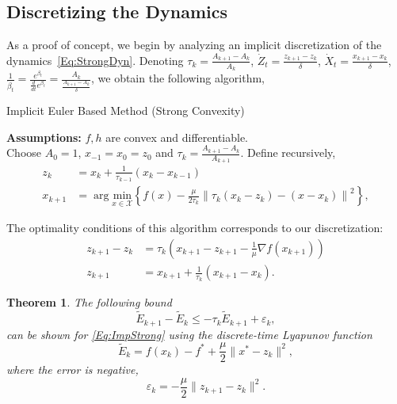 \documentclass[11pt]{article}
\theoremstyle{plain}
\newtheorem{theorem}{Theorem}
\newcommand{\X}{{\mathcal X}}
\begin{document}
\subsection{Discretizing the Dynamics}
As a proof of concept, we begin by analyzing an implicit discretization of the dynamics~\eqref{Eq:StrongDyn}. 
Denoting  $\tau_k = \frac{A_{k+1} - A_k}{A_k}$, $\dot Z_t = \frac{z_{k+1} - z_k}{\delta}$, $\dot X_t = \frac{x_{k+1} - x_k}{\delta}$, $\frac{1}{\dot \beta_t} = \frac{e^{\beta_t}}{\frac{d}{dt} e^{\beta_t}} = \frac{A_{k}}{\frac{A_{k+1} - A_k}{\delta}}$, 
we obtain the following algorithm, 
\begin{algorithm}[H]
\caption{Implicit Euler Based Method (Strong Convexity)}
{\bf Assumptions:} $f, h$ are convex and differentiable.\\
Choose $A_0 = 1$, $x_{-1}=x_0 = z_0$ and $\tau_{k} = \frac{A_{k+1} - A_k}{A_{k+1}}$. Define recursively,
\begin{subequations}
\begin{align}\label{Eq:AlgoForward}
z_{k} &= x_{k} + \frac{1}{\tau_{k-1}}(x_{k} - x_{k-1})\\
x_{k+1} &= \arg\underset{x\in\X}{\text{min}} \left\{ f(x) - \frac{\mu}{2\tau_k}\left\|\tau_k(x_k - z_k) - (x - x_k)\right\|^2\right\},
\end{align}
\end{subequations}
\end{algorithm}
\noindent The optimality conditions of this algorithm corresponds to our discretization: 
\begin{subequations}\label{Eq:ImpStrong}
\begin{align}
z_{k+1} - z_k &= \tau_k \left( x_{k+1} - z_{k+1} - \frac{1}{\mu} \nabla f(x_{k+1})\right) \label{Eq:ZImpStrong}\\
z_{k+1} &= x_{k+1} + \frac{1}{\tau_k}(x_{k+1} - x_k)\label{Eq:ImpStrong}.
\end{align}
\end{subequations}
\begin{theorem}
The following bound
\begin{equation*}
\tilde E_{k+1} -\tilde E_k \leq - \tau_k \tilde E_{k+1} + \varepsilon_k,
\end{equation*}
can be shown for \eqref{Eq:ImpStrong} using the discrete-time Lyapunov function
\begin{equation}
\tilde E_k = f(x_k) - f^\ast + \frac{\mu}{2}\|x^\ast- z_k\|^2,
\end{equation}
where the error is negative,
\begin{equation*}
\varepsilon_k = - \frac{\mu}{2} \|z_{k+1} - z_k\|^2.
\end{equation*}
\end{theorem}
\end{document}
